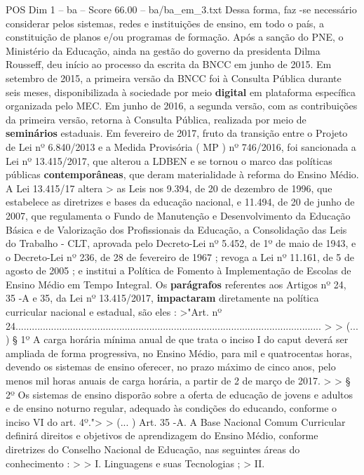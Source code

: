 \begin{textsample}{POS Dim 1 – ba – Score 66.00 – ba/ba\_em\_3.txt}
Dessa forma, faz -se necessário considerar pelos sistemas, redes e instituições de ensino, em todo o país, a constituição de planos e/ou programas de formação.
Após a sanção do PNE, o Ministério da Educação, ainda na gestão do governo da presidenta Dilma Rousseff, deu início ao processo da escrita da BNCC em junho de 2015.
Em setembro de 2015, a primeira versão da BNCC foi à Consulta Pública durante seis meses, disponibilizada à sociedade por meio \textbf{digital} em plataforma específica organizada pelo MEC.
Em junho de 2016, a segunda versão, com as contribuições da primeira versão, retorna à Consulta Pública, realizada por meio de \textbf{seminários} estaduais.
Em fevereiro de 2017, fruto da transição entre o Projeto de Lei nº 6.840/2013 e a Medida Provisória ( MP ) nº 746/2016, foi sancionada a Lei nº 13.415/2017, que alterou a LDBEN e se tornou o marco das políticas públicas \textbf{contemporâneas}, que deram materialidade à reforma do Ensino Médio.
A Lei 13.415/17 altera > as Leis nos 9.394, de 20 de dezembro de 1996, que estabelece as diretrizes e bases da educação nacional, e 11.494, de 20 de junho de 2007, que regulamenta o Fundo de Manutenção e Desenvolvimento da Educação Básica e de Valorização dos Profissionais da Educação, a Consolidação das Leis do Trabalho - CLT, aprovada pelo Decreto-Lei nº 5.452, de 1º de maio de 1943, e o Decreto-Lei nº 236, de 28 de fevereiro de 1967 ; revoga a Lei nº 11.161, de 5 de agosto de 2005 ; e institui a Política de Fomento à Implementação de Escolas de Ensino Médio em Tempo Integral.
Os \textbf{parágrafos} referentes aos Artigos nº 24, 35 -A e 35, da Lei nº 13.415/2017, \textbf{impactaram} diretamente na política curricular nacional e estadual, são eles : >"Art. nº 24................................................................................................................ > > (... ) § 1º A carga horária mínima anual de que trata o inciso I do caput deverá ser ampliada de forma progressiva, no Ensino Médio, para mil e quatrocentas horas, devendo os sistemas de ensino oferecer, no prazo máximo de cinco anos, pelo menos mil horas anuais de carga horária, a partir de 2 de março de 2017. > > § 2º Os sistemas de ensino disporão sobre a oferta de educação de jovens e adultos e de ensino noturno regular, adequado às condições do educando, conforme o inciso VI do art. 4º."> > (... ) Art. 35 -A.
A Base Nacional Comum Curricular definirá direitos e objetivos de aprendizagem do Ensino Médio, conforme diretrizes do Conselho Nacional de Educação, nas seguintes áreas do conhecimento : > > I.
Linguagens e suas Tecnologias ; > II.

\end{textsample}
